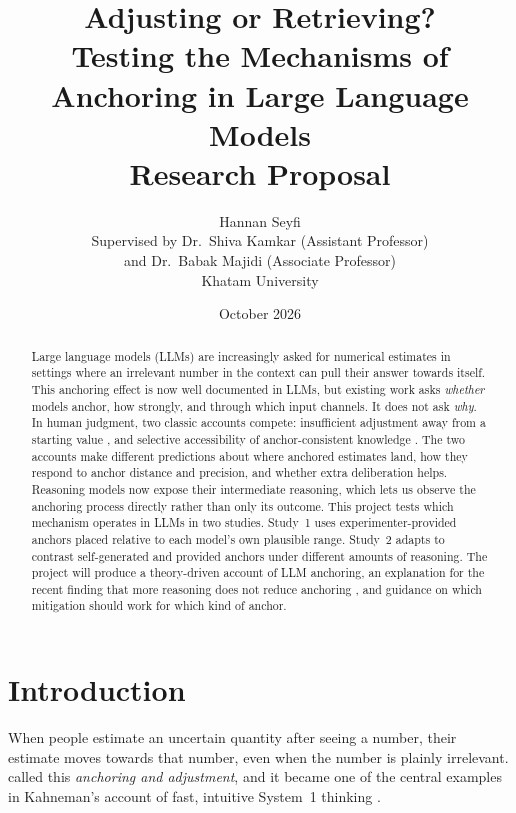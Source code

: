 \documentclass[11pt,a4paper]{article}
\title{\textbf{Adjusting or Retrieving?}\\[4pt]
\large Testing the Mechanisms of Anchoring in Large Language Models\\[2pt]
\normalsize Research Proposal}
\author{Hannan Seyfi\\[8pt]
\normalsize Supervised by Dr.\ Shiva Kamkar (Assistant Professor)\\
\normalsize and Dr.\ Babak Majidi (Associate Professor)\\[8pt]
\normalsize Khatam University}
\date{October 2026}
\begin{document}
\maketitle

\begin{abstract}
\noindent
Large language models (LLMs) are increasingly asked for numerical estimates in settings where an irrelevant number in the context can pull their answer towards itself. This anchoring effect is now well documented in LLMs, but existing work asks \emph{whether} models anchor, how strongly, and through which input channels. It does not ask \emph{why}. In human judgment, two classic accounts compete: insufficient adjustment away from a starting value \citep{tversky1974judgment,epley2006anchoring}, and selective accessibility of anchor-consistent knowledge \citep{strack1997explaining,mussweiler1999hypothesis}. The two accounts make different predictions about where anchored estimates land, how they respond to anchor distance and precision, and whether extra deliberation helps. Reasoning models now expose their intermediate reasoning, which lets us observe the anchoring process directly rather than only its outcome. This project tests which mechanism operates in LLMs in two studies. Study~1 uses experimenter-provided anchors placed relative to each model's own plausible range. Study~2 adapts \citet{epley2001putting} to contrast self-generated and provided anchors under different amounts of reasoning. The project will produce a theory-driven account of LLM anchoring, an explanation for the recent finding that more reasoning does not reduce anchoring \citep{kraishan2026long}, and guidance on which mitigation should work for which kind of anchor.
\end{abstract}

\section{Introduction}

When people estimate an uncertain quantity after seeing a number, their estimate moves towards that number, even when the number is plainly irrelevant. \citet{tversky1974judgment} called this \emph{anchoring and adjustment}, and it became one of the central examples in Kahneman's account of fast, intuitive System~1 thinking \citep{kahneman2011thinking}.
\end{document}
